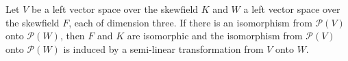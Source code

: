 Let $V$ be a left vector space over the skewfield $K$ and $W$ a left vector space over the skewfield $F$, each of dimension three. If there is an isomorphism from $\mathcal{P}(V)$ onto $\mathcal{P}(W)$, then $F$ and $K$ are isomorphic and the isomorphism from $\mathcal{P}(V)$ onto $\mathcal{P}(W)$ is induced by a semi-linear transformation from $V$ onto $W$.
